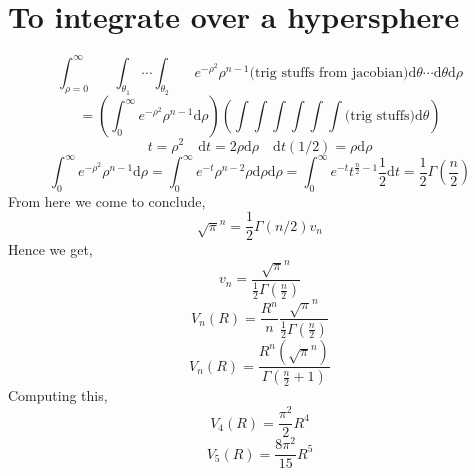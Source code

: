 \documentclass[letter]{article}
\begin{document}
\section*{To integrate over a hypersphere} 
\[
	\int_{\rho = 0}^{\infty } \quad \int_{\theta_1} \cdots \int_{\theta_2} \quad e^{-\rho^2} \rho^{n-1} \text{(trig stuffs from jacobian)} \mathrm{d} \theta \cdots \mathrm{d} \theta \mathrm{d} \rho
\]
\[
= \left(
\int_{0}^{\infty} e^{-\rho ^2} \rho^{n -1} \mathrm{d} \rho 
\right) 
\left(
\int \int \int \int \int \int 
\text{(trig stuffs)} \mathrm{d} \theta 
\right)
\]
\[
t = \rho^2 \quad \mathrm{d} t = 2 \rho \mathrm{d} \rho \quad \mathrm{d} t \left(1 / 2\right) = \rho \mathrm{d} \rho
\]
\[
\int_{0}^{\infty} e^{-\rho ^2} \rho^{n -1} \mathrm{d} \rho  = 
\int_{0}^{\infty} e^{-t} \rho^{n- 2} \rho \mathrm{d} \rho \mathrm{d} \rho = 
\int_{0}^{\infty} e^{-t} t ^{\frac{n}{2} - 1} \frac{1}{2} \mathrm{d} t = \frac{1}{2} \Gamma\left(\frac{n}{2}\right) 
\]
From here we come to conclude, 
\[
\sqrt{\pi }  ^{n } = \frac{1}{2} \Gamma (n / 2) v_n 
\] 
Hence we get, 
\[
v_n = \frac{\sqrt{ \pi } ^{n} }{\frac{1}{ 2} \Gamma \left(\frac{n}{2}\right)}
\]
\[
V_n (R) = \frac{R^{n } }{n} \frac{\sqrt{\pi }^{n}  }{\frac{1}{2} \Gamma(\frac{n}{2})}
\]
\[
\boxed{
V_n(R) = \frac{R^{n} \left(\sqrt{ \pi } ^{n} \right)}{\Gamma(\frac{n}{2} + 1)}
}
\] 
Computing this, 
\[
V_4 (R) = \frac{\pi ^2}{2} R^{4}
\] 
\[
V_5 (R) = \frac{8 \pi ^2}{15} R^{5}
\] 
\end{document}
